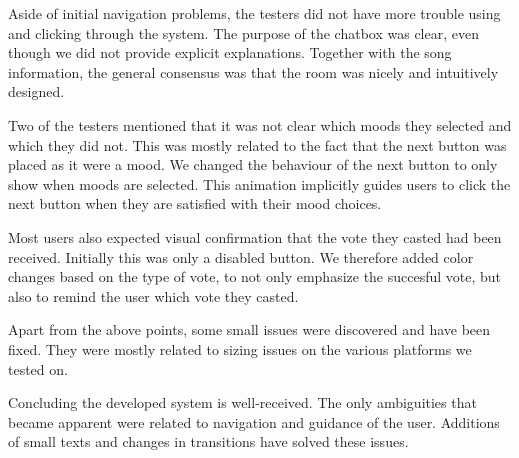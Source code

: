 Aside of initial navigation problems, the testers did not have more trouble using and clicking through the system.
The purpose of the chatbox was clear, even though we did not provide explicit explanations.
Together with the song information, the general consensus was that the room was nicely  and intuitively designed.

Two of the testers mentioned that it was not clear which moods they selected and which they did not.
This was mostly related to the fact that the next button was placed as it were a mood.
We changed the behaviour of the next button to only show when moods are selected.
This animation implicitly guides users to click the next button when they are satisfied with their mood choices.

Most users also expected visual confirmation that the vote they casted had been received.
Initially this was only a disabled button.
We therefore added color changes based on the type of vote, to not only emphasize the succesful vote, but also to remind the user which vote they casted.

Apart from the above points, some small issues were discovered and have been fixed.
They were mostly related to sizing issues on the various platforms we tested on.

Concluding the developed system is well-received.
The only ambiguities that became apparent were related to navigation and guidance of the user.
Additions of small texts and changes in transitions have solved these issues.